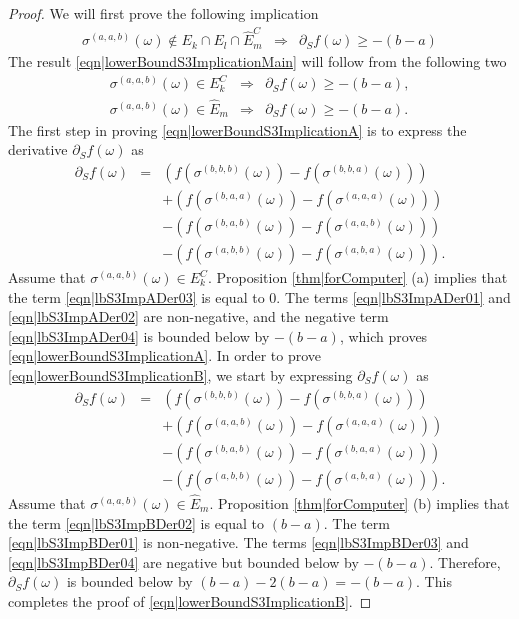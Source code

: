 \documentclass[reqno]{amsart}
\begin{document}
\begin{proof}
We will first prove the following implication
\begin{eqnarray}
\sigma^{(a,a,b)}(\omega)\not\in E_k\cap E_l\cap \hat E_m^C&\Longrightarrow& \partial_Sf(\omega)\geq -(b-a)
\label{eqn|lowerBoundS3ImplicationMain}
\end{eqnarray}
The result \eqref{eqn|lowerBoundS3ImplicationMain} will follow from the following two
\begin{eqnarray}
\sigma^{(a,a,b)}(\omega)\in E_k^C &\Longrightarrow& \partial_Sf(\omega)\geq -(b-a),\label{eqn|lowerBoundS3ImplicationA}\\
\sigma^{(a,a,b)}(\omega)\in \hat E_m &\Longrightarrow& \partial_Sf(\omega)\geq -(b-a).\label{eqn|lowerBoundS3ImplicationB}
\end{eqnarray}
The first step in proving \eqref{eqn|lowerBoundS3ImplicationA} is to express the derivative $\partial_Sf(\omega)$ 
as 
\begin{eqnarray}
\partial_Sf(\omega)&=& \left(f(\sigma^{(b,b,b)}(\omega))-f(\sigma^{(b,b,a)}(\omega))\right) \label{eqn|lbS3ImpADer01}\\
&& +\left(f(\sigma^{(b,a,a)}(\omega))-
f(\sigma^{(a,a,a)}(\omega))\right) \label{eqn|lbS3ImpADer02}\\
&&-\left(f(\sigma^{(b,a,b)}(\omega))-f(\sigma^{(a,a,b)}(\omega))\right) \label{eqn|lbS3ImpADer03}\\
&&-\left(f(\sigma^{(a,b,b)}(\omega))-f(\sigma^{(a,b,a)}(\omega))
\right). \label{eqn|lbS3ImpADer04}
\end{eqnarray}
Assume that $\sigma^{(a,a,b)}(\omega)\in E_k^C$. Proposition \ref{thm|forComputer} (a) implies that the term \eqref{eqn|lbS3ImpADer03} 
is equal to $0$. The terms \eqref{eqn|lbS3ImpADer01} and \eqref{eqn|lbS3ImpADer02} are non-negative, and the negative term \eqref{eqn|lbS3ImpADer04} is bounded below
by $-(b-a)$, which proves \eqref{eqn|lowerBoundS3ImplicationA}.
In order to prove \eqref{eqn|lowerBoundS3ImplicationB}, we start by expressing $\partial_Sf(\omega)$ as 
\begin{eqnarray}
\partial_Sf(\omega)&=& \left(f(\sigma^{(b,b,b)}(\omega))-f(\sigma^{(b,b,a)}(\omega))\right) \label{eqn|lbS3ImpBDer01}\\
&& +\left(f(\sigma^{(a,a,b)}(\omega))-
f(\sigma^{(a,a,a)}(\omega))\right) \label{eqn|lbS3ImpBDer02}\\
&&-\left(f(\sigma^{(b,a,b)}(\omega))-f(\sigma^{(b,a,a)}(\omega))\right) \label{eqn|lbS3ImpBDer03}\\
&&-\left(f(\sigma^{(a,b,b)}(\omega))-f(\sigma^{(a,b,a)}(\omega))
\right). \label{eqn|lbS3ImpBDer04}
\end{eqnarray}
Assume that $\sigma^{(a,a,b)}(\omega)\in \hat E_m$. Proposition \ref{thm|forComputer} (b) implies that the term \eqref{eqn|lbS3ImpBDer02} is equal to $(b-a)$. The term 
\eqref{eqn|lbS3ImpBDer01} is non-negative. The terms \eqref{eqn|lbS3ImpBDer03} and \eqref{eqn|lbS3ImpBDer04} are negative but bounded below by $-(b-a)$. Therefore, $\partial_Sf(\omega)$ is bounded below by $(b-a)-2(b-a)=-(b-a)$. This completes the proof of \eqref{eqn|lowerBoundS3ImplicationB}. 


\end{proof}
\end{document}
